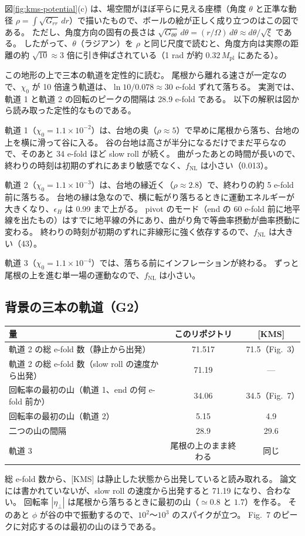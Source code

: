 \documentclass[a4paper,11pt]{ltjsarticle}
\newcommand{\Mpl}{M_{\mathrm{pl}}}
\newcommand{\fnl}{f_{\mathrm{NL}}}
\begin{document}
図\ref{fig:kms-potential}(c) は、場空間がほぼ平らに見える座標（角度 $\theta$ と正準な動径 $\rho=\int\sqrt{G_{rr}}\,dr$）で描いたもので、ボールの絵が正しく成り立つのはこの図である。
ただし、角度方向の固有の長さは $\sqrt{G_{\theta\theta}}\,d\theta=(r/\Omega)\,d\theta\approx d\theta/\sqrt\xi$ である。
したがって、$\theta$（ラジアン）を $\rho$ と同じ尺度で読むと、角度方向は実際の距離の約 $\sqrt{10}\approx3$ 倍に引き伸ばされている（1 rad が約 $0.32\,\Mpl$ にあたる）。

この地形の上で三本の軌道を定性的に読む。
尾根から離れる速さが一定なので、$\chi_0$ が 10 倍違う軌道は、$\ln10/0.078\approx30$ e-fold ずれて落ちる。
実測では、軌道 1 と軌道 2 の回転のピークの間隔は 28.9 e-fold である。
以下の解釈は図から読み取った定性的なものである。

軌道 1（$\chi_0=1.1\times10^{-2}$）は、台地の奥（$\rho\approx5$）で早めに尾根から落ち、台地の上を横に滑って谷に入る。
谷の台地は高さが半分になるだけでまだ平らなので、そのあと 34 e-fold ほど slow roll が続く。
曲がったあとの時間が長いので、終わりの時刻は初期のずれにあまり敏感でなく、$\fnl$ は小さい（0.013）。

軌道 2（$\chi_0=1.1\times10^{-3}$）は、台地の縁近く（$\rho\approx2.8$）で、終わりの約 5 e-fold 前に落ちる。
台地の縁は急なので、横に転がり落ちるときに運動エネルギーが大きくなり、$\epsilon_H$ は 0.99 まで上がる。
pivot のモード（end の 60 e-fold 前に地平線を出たもの）はすでに地平線の外にあり、曲がり角で等曲率摂動が曲率摂動に変わる。
終わりの時刻が初期のずれに非線形に強く依存するので、$\fnl$ は大きい（43）。

軌道 3（$\chi_0=1.1\times10^{-4}$）では、落ちる前にインフレーションが終わる。
ずっと尾根の上を進む単一場の運動なので、$\fnl$ は小さい。

\subsection{背景の三本の軌道（G2）}

\begin{center}
\begin{tabular}{lcc}
\toprule
量 & このリポジトリ & [KMS] \\
\midrule
軌道 2 の総 e-fold 数（静止から出発） & 71.517 & 71.5（Fig.~3） \\
軌道 2 の総 e-fold 数（slow roll の速度から出発） & 71.19 & --- \\
回転率の最初の山（軌道 1、end の何 e-fold 前か） & 34.06 & 34.5（Fig.~7） \\
回転率の最初の山（軌道 2） & 5.15 & 4.9 \\
二つの山の間隔 & 28.9 & 29.6 \\
軌道 3 & 尾根の上のまま終わる & 同じ \\
\bottomrule
\end{tabular}
\end{center}
総 e-fold 数から、[KMS] は静止した状態から出発していると読み取れる。
論文には書かれていないが、slow roll の速度から出発すると 71.19 になり、合わない。
回転率 $|\eta_\perp|$ は尾根から落ちるときに最初の山（$\simeq0.8$ と $1.7$）を作る。
そのあと $\phi$ が谷の中で振動するので、$10^2$〜$10^3$ のスパイクが立つ。
Fig.~7 のピークに対応するのは最初の山のほうである。
\end{document}
